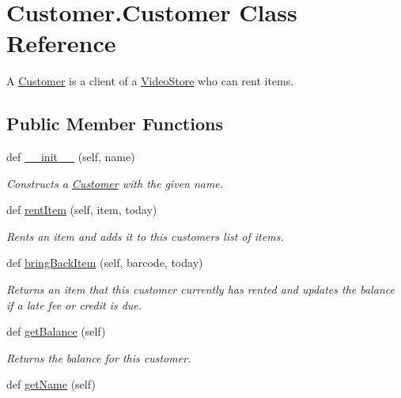 \hypertarget{classCustomer_1_1Customer}{}\section{Customer.\+Customer Class Reference}
\label{classCustomer_1_1Customer}


A \hyperlink{classCustomer_1_1Customer}{Customer} is a client of a \hyperlink{namespaceVideoStore}{Video\+Store} who can rent items.  


\subsection*{Public Member Functions}
\begin{DoxyCompactItemize}
\item 
def \hyperlink{classCustomer_1_1Customer_a9a6e72f7972ab6669244ee32b5c15fa8}{\+\_\+\+\_\+init\+\_\+\+\_\+} (self, name)
\begin{DoxyCompactList}\small\item\em Constructs a \hyperlink{classCustomer_1_1Customer}{Customer} with the given name. \end{DoxyCompactList}\item 
def \hyperlink{classCustomer_1_1Customer_aeda8ba0748ed02a22582207d04d90d62}{rent\+Item} (self, item, today)
\begin{DoxyCompactList}\small\item\em Rents an item and adds it to this customer\textquotesingle{}s list of items. \end{DoxyCompactList}\item 
def \hyperlink{classCustomer_1_1Customer_ac589f3f34db4ca44e3071e7260f5f8b6}{bring\+Back\+Item} (self, barcode, today)
\begin{DoxyCompactList}\small\item\em Returns an item that this customer currently has rented and updates the balance if a late fee or credit is due. \end{DoxyCompactList}\item 
def \hyperlink{classCustomer_1_1Customer_aebb56585524424bcededa48f90a2dde6}{get\+Balance} (self)
\begin{DoxyCompactList}\small\item\em Returns the balance for this customer. \end{DoxyCompactList}\item 
def \hyperlink{classCustomer_1_1Customer_a154e1dbfb02e85d29b52e620b6283677}{get\+Name} (self)

\end{DoxyCompactItemize}
